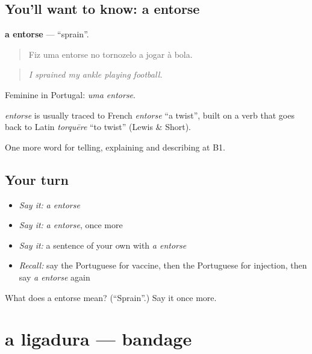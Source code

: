 \subsection*{You'll want to know: a entorse}
\textbf{a entorse} — \textquotedblleft{}sprain\textquotedblright{}.

\begin{quote}
Fiz uma entorse no tornozelo a jogar à bola.
\end{quote}

\begin{quote}
\emph{I sprained my ankle playing football.}
\end{quote}

Feminine in Portugal: \emph{uma entorse}.

\begin{cousinweb}
\emph{entorse} is usually traced to French \emph{entorse} \textquotedblleft{}a twist\textquotedblright{}, built on a verb that goes back to Latin \emph{torquēre} \textquotedblleft{}to twist\textquotedblright{} (Lewis \& Short).
\end{cousinweb}

\begin{grammarlens}[title={What you've built}]
One more word for telling, explaining and describing at B1.
\end{grammarlens}

\subsection*{Your turn}
\begin{itemize}
\raggedright
  \item \emph{Say it:} \emph{a entorse}
  \item \emph{Say it:} \emph{a entorse}, once more
  \item \emph{Say it:} a sentence of your own with \emph{a entorse}
  \item \emph{Recall:} say the Portuguese for vaccine, then the Portuguese for injection, then say \emph{a entorse} again
\end{itemize}

\begin{tcolorbox}[breakable,colback=teal!4,colframe=teal!35!black,title={Before you move on}]
What does a entorse mean? (\textquotedblleft{}Sprain\textquotedblright{}.) Say it once more.
\end{tcolorbox}
\section[a ligadura]{a ligadura — bandage}

